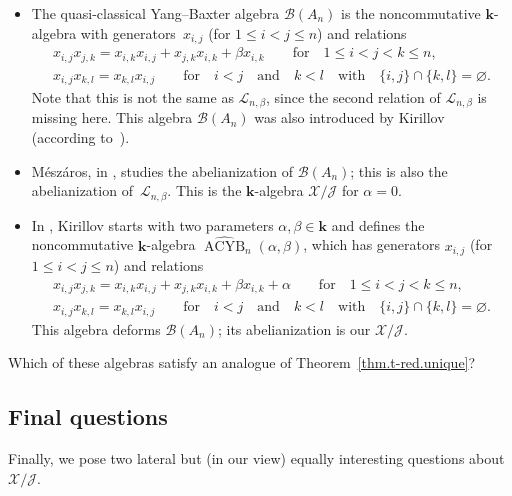 \documentclass[pdftex]{sigma}
\numberwithin{equation}{section}
\begin{document}
\begin{itemize}
\item The quasi-classical Yang--Baxter algebra $\mathcal{B}(A_{n}) $ is the noncommutative $\mathbf{k}$-algebra with generators~$x_{i,j}$ (for $1\leq i<j\leq n$) and relations
\begin{gather*}
x_{i,j}x_{j,k} =x_{i,k}x_{i,j}+x_{j,k}x_{i,k}+\beta x_{i,k} \qquad \text{for} \quad 1\leq i<j<k\leq n,\\
x_{i,j}x_{k,l} =x_{k,l}x_{i,j} \qquad \text{for} \quad i<j \quad \text{and} \quad k<l \quad \text{with} \quad \{i,j\}\cap\{ k,l\}=\varnothing.
\end{gather*}
Note that this is not the same as $\mathcal{L}_{n,\beta}$, since the second relation of $\mathcal{L}_{n,\beta}$ is missing here. This algebra
$\mathcal{B}(A_{n}) $ was also introduced by Kirillov (according to~\cite{Meszar09}).

\item M\'{e}sz\'{a}ros, in \cite{Meszar09}, studies the abelianization of $\mathcal{B}(A_{n}) $; this is also the abelianization of~$\mathcal{L}_{n,\beta}$. This is the $\mathbf{k}$-algebra $\mathcal{X}/\mathcal{J}$ for $\alpha=0$.

\item In \cite[Definition 5.1]{Kirill16}, Kirillov starts with two parameters $\alpha,\beta\in\mathbf{k}$ and defines the noncommutative $\mathbf{k}$-algebra $\widehat{\operatorname*{ACYB}}_{n} ( \alpha,\beta ) $, which has generators $x_{i,j}$ (for $1\leq i<j\leq n$) and relations%
\begin{gather*}
x_{i,j}x_{j,k} =x_{i,k}x_{i,j}+x_{j,k}x_{i,k}+\beta x_{i,k}+\alpha \qquad \text{for} \quad 1\leq i<j<k\leq n,\\
x_{i,j}x_{k,l}=x_{k,l}x_{i,j} \qquad \text{for} \quad i<j \quad \text{and} \quad k<l \quad \text{with} \quad \{i,j\}\cap\{k,l\} =\varnothing.
\end{gather*}
This algebra deforms $\mathcal{B}(A_{n}) $; its abelianization is our $\mathcal{X}/\mathcal{J}$.
\end{itemize}

\begin{question}Which of these algebras satisfy an analogue of Theorem~\ref{thm.t-red.unique}?
\end{question}

\subsection{Final questions}

Finally, we pose two lateral but (in our view) equally interesting questions about $\mathcal{X}/\mathcal{J}$.
\end{document}
